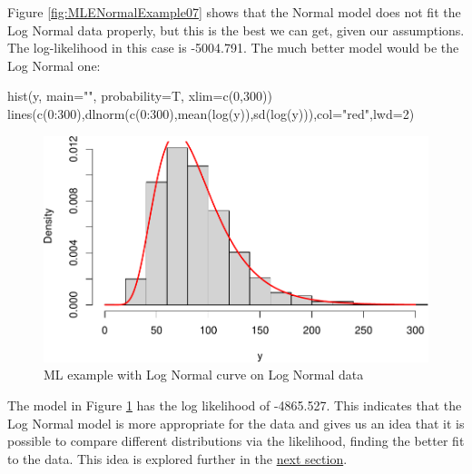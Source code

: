 \documentclass[
]{book}
\newenvironment{Shaded}{\begin{snugshade}}{\end{snugshade}}
\newcommand{\AttributeTok}[1]{\textcolor[rgb]{0.77,0.63,0.00}{#1}}
\newcommand{\DecValTok}[1]{\textcolor[rgb]{0.00,0.00,0.81}{#1}}
\newcommand{\FunctionTok}[1]{\textcolor[rgb]{0.00,0.00,0.00}{#1}}
\newcommand{\NormalTok}[1]{#1}
\newcommand{\SpecialCharTok}[1]{\textcolor[rgb]{0.00,0.00,0.00}{#1}}
\newcommand{\StringTok}[1]{\textcolor[rgb]{0.31,0.60,0.02}{#1}}
\theoremstyle{definition}
\theoremstyle{definition}
\theoremstyle{definition}
\theoremstyle{definition}
\theoremstyle{remark}
\begin{document}
Figure \ref{fig:MLENormalExample07} shows that the Normal model does not fit the Log Normal data properly, but this is the best we can get, given our assumptions. The log-likelihood in this case is -5004.791. The much better model would be the Log Normal one:

\begin{Shaded}
\begin{Highlighting}[]
\FunctionTok{hist}\NormalTok{(y, }\AttributeTok{main=}\StringTok{""}\NormalTok{, }\AttributeTok{probability=}\NormalTok{T, }\AttributeTok{xlim=}\FunctionTok{c}\NormalTok{(}\DecValTok{0}\NormalTok{,}\DecValTok{300}\NormalTok{))}
\FunctionTok{lines}\NormalTok{(}\FunctionTok{c}\NormalTok{(}\DecValTok{0}\SpecialCharTok{:}\DecValTok{300}\NormalTok{),}\FunctionTok{dlnorm}\NormalTok{(}\FunctionTok{c}\NormalTok{(}\DecValTok{0}\SpecialCharTok{:}\DecValTok{300}\NormalTok{),}\FunctionTok{mean}\NormalTok{(}\FunctionTok{log}\NormalTok{(y)),}\FunctionTok{sd}\NormalTok{(}\FunctionTok{log}\NormalTok{(y))),}\AttributeTok{col=}\StringTok{"red"}\NormalTok{,}\AttributeTok{lwd=}\DecValTok{2}\NormalTok{)}
\end{Highlighting}
\end{Shaded}

\begin{figure}
\centering
\includegraphics{Svetunkov---Statistics-for-Business-Analytics_files/figure-latex/MLENormalExample08-1.pdf}
\caption{\label{fig:MLENormalExample08}ML example with Log Normal curve on Log Normal data}
\end{figure}

The model in Figure \ref{fig:MLENormalExample08} has the log likelihood of -4865.527. This indicates that the Log Normal model is more appropriate for the data and gives us an idea that it is possible to compare different distributions via the likelihood, finding the better fit to the data. This idea is explored further in the \protect\hyperlink{modelSelection}{next section}.
\end{document}
